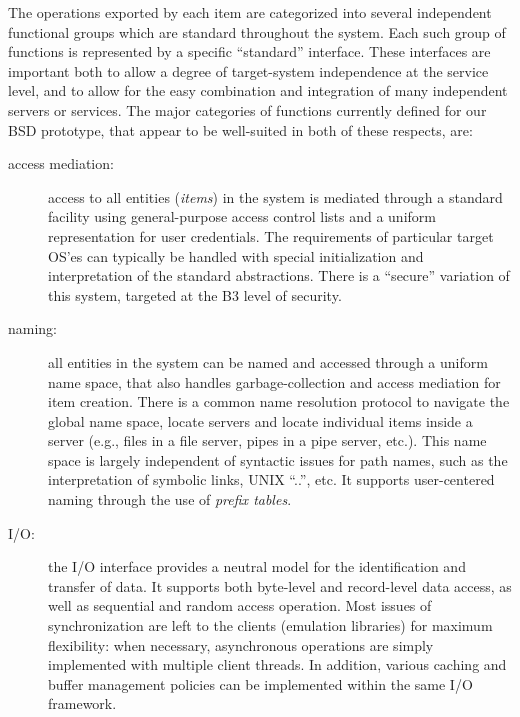 
The operations exported by each item are categorized into several
independent functional groups which are standard throughout the
system. Each such group of functions is represented by a specific
``standard'' interface.  These interfaces are important both to allow
a degree of target-system independence at the service level, and to
allow for the easy combination and integration of many independent
servers or services.  The major categories of functions currently
defined for our BSD prototype, that appear to be well-suited in both
of these respects, are:
\begin{description}

\item[access mediation:] access to all entities ({\em items}) in the
system is mediated through a standard facility using general-purpose
access control lists and a uniform representation for user
credentials.  The requirements of particular target OS'es can
typically be handled with special initialization and interpretation of
the standard abstractions. There is a ``secure'' variation of this
system, targeted at the B3 level of security\cite{TIS90}.

\item[naming:] all entities in the system can be named and accessed
through a uniform name space, that also handles garbage-collection and
access mediation for item creation. There is a common name resolution
protocol to navigate the global name space, locate servers and locate
individual items inside a server (e.g., files in a file server, pipes in
a pipe server, etc.).  This name space is largely independent of
syntactic issues for path names, such as the interpretation of
symbolic links, UNIX ``..'', etc. It supports user-centered naming
through the use of {\em prefix tables}\cite{WELCH86}.

\item[I/O:] the I/O interface provides a neutral model for the
identification and transfer of data. It supports both byte-level and
record-level data access, as well as sequential and random access
operation. Most issues of synchronization are left to the clients
(emulation libraries) for maximum flexibility: when necessary,
asynchronous operations are simply implemented with multiple client
threads. In addition, various caching and buffer management policies
can be implemented within the same I/O framework.


\end{description}
